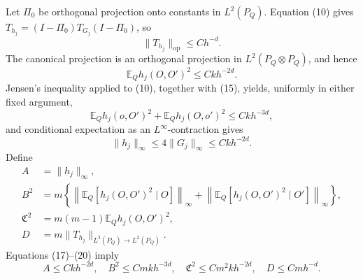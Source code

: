 Let \(\Pi_0\) be orthogonal projection onto constants in \(L^2(P_Q)\).  Equation (10) gives \(T_{h_j}=(I-\Pi_0)T_{G_j}(I-\Pi_0)\), so
\[
 \|T_{h_j}\|_{\mathrm{op}}\le Ch^{-d}.
\tag{17}
\]
The canonical projection is an orthogonal projection in \(L^2(P_Q\otimes P_Q)\), and hence
\[
 \mathbb E_Qh_j(O,O')^2\le Ckh^{-2d}.
\tag{18}
\]
Jensen's inequality applied to (10), together with (15), yields, uniformly in either fixed argument,
\[
 \mathbb E_Qh_j(o,O')^2+\mathbb E_Qh_j(O,o')^2\le Ckh^{-3d},
\tag{19}
\]
and conditional expectation as an \(L^\infty\)-contraction gives
\[
 \|h_j\|_\infty\le4\|G_j\|_\infty\le Ckh^{-2d}.
\tag{20}
\]
Define
\[
 \begin{aligned}
 A&=\|h_j\|_\infty,\\
 B^2&=m\left\{\left\|\mathbb E_Q[h_j(O,O')^2\mid O]\right\|_\infty
               +\left\|\mathbb E_Q[h_j(O,O')^2\mid O']\right\|_\infty\right\},\\
 \mathfrak C^2&=m(m-1)\mathbb E_Qh_j(O,O')^2,\\
 D&=m\|T_{h_j}\|_{L^2(P_Q)\to L^2(P_Q)}.
 \end{aligned}
\]
Equations (17)--(20) imply
\[
 A\le Ckh^{-2d},\quad B^2\le Cmkh^{-3d},\quad
 \mathfrak C^2\le Cm^2kh^{-2d},\quad D\le Cmh^{-d}.
\tag{21}
\]

